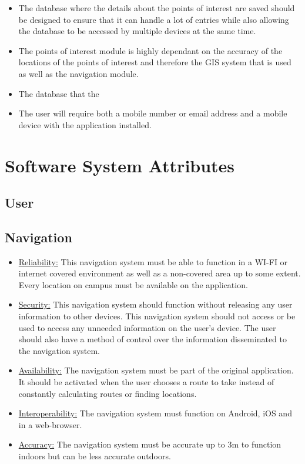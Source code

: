 \documentclass[runningheads,a4paper]{article}
\begin{document}
\begin{itemize}
\item The database where the details about the points of interest are saved should be designed to ensure that it can handle a lot of entries while also allowing the database to be accessed by multiple devices at the same time.

\item The points of interest module is highly dependant on the accuracy of the locations of the points of interest and therefore the GIS system that is used as well as the navigation module.

\end{itemize}

\begin{itemize}
\item The database that the 

\item The user will require both a mobile number or email address and a mobile device with the application installed.
\end{itemize}

\section{Software System Attributes}

\subsection{User}
\subsection{Navigation}
\begin{itemize}
\item \underline{Reliability:} 
This navigation system must be able to function in a WI-FI or internet covered environment as well as a non-covered area up to some extent. Every location on campus must be available on the application. 

\item \underline{Security:}
This navigation system should function without releasing any user information to other devices. This navigation system should not access or be used to access any unneeded information on the user’s device. The user should also have a method of control over the information disseminated to the navigation system.

\item \underline{Availability:}
The navigation system must be part of the original application. It should be activated when the user chooses a route to take instead of constantly calculating routes or finding locations. 

\item \underline{Interoperability:}
The navigation system must function on Android, iOS and in a web-browser.

\item \underline{Accuracy:}
The navigation system must be accurate up to 3m to function indoors but can be less accurate outdoors. 
\end{itemize}
\end{document}
